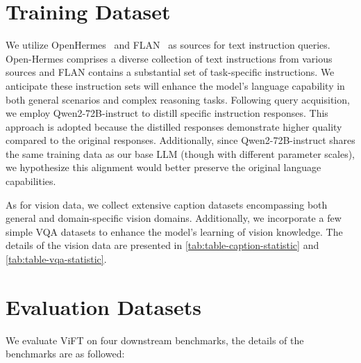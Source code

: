



\section{Training Dataset}\label{apdx-train_data}
We utilize OpenHermes~\cite{OpenHermes2-5} and FLAN~\cite{longpre2023flan} as sources for text instruction queries. Open-Hermes comprises a diverse collection of text instructions from various sources and FLAN contains a substantial set of task-specific instructions. We anticipate these instruction sets will enhance the model's language capability in both general scenarios and complex reasoning tasks. Following query acquisition, we employ Qwen2-72B-instruct to distill specific instruction responses. This approach is adopted because the distilled responses demonstrate higher quality compared to the original responses. Additionally, since Qwen2-72B-instruct shares the same training data as our base LLM (though with different parameter scales), we hypothesize this alignment would better preserve the original language capabilities.

As for vision data, we collect extensive caption datasets encompassing both general and domain-specific vision domains. Additionally, we incorporate a few simple VQA datasets to enhance the model's learning of vision knowledge. The details of the vision data are presented in \autoref{tab:table-caption-statistic} and \autoref{tab:table-vqa-statistic}.

\section{Evaluation Datasets}\label{evaluation_dataset}
We evaluate ViFT on four downstream benchmarks, the details of the benchmarks are as followed:

